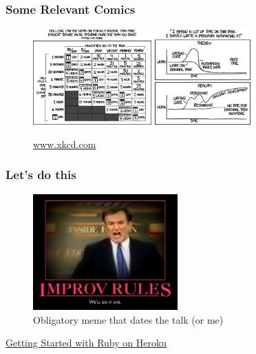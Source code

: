 \documentclass{beamer}
\begin{document}
\begin{frame}[fragile]
  \frametitle{Some Relevant Comics}

   \begin{figure}[p]
    \centering
    \includegraphics[height=10em]{is_it_worth_the_time.png}
    \includegraphics[height=10em]{automation.png}
    \caption{\url{www.xkcd.com}}
  \end{figure}

\end{frame}

\begin{frame}[fragile]
  \frametitle{Let's do this}

   \begin{figure}[p]
    \centering
    \includegraphics[width=15em]{well-do-it-live.jpg}
    \caption{Obligatory meme that dates the talk (or me)}
  \end{figure}

  \centering\href{https://devcenter.heroku.com/articles/getting-started-with-ruby#introduction}{Getting Started with Ruby on Heroku}
  
\end{frame}
\end{document}
